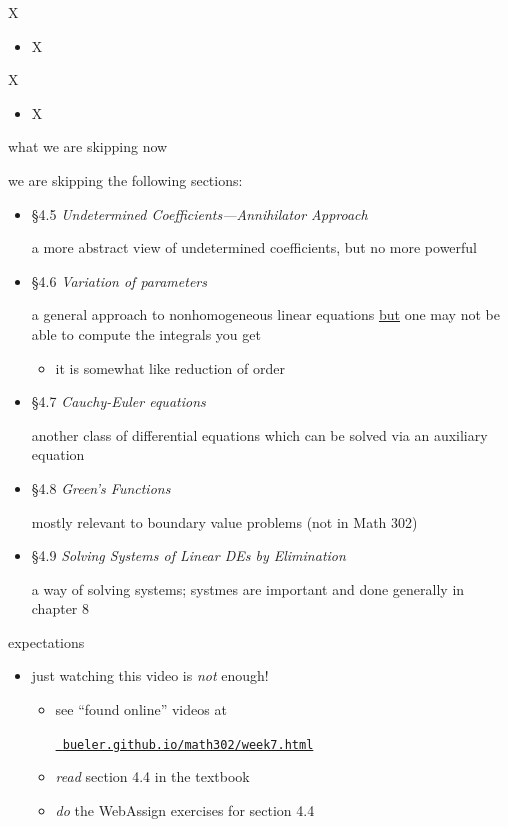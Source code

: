 \documentclass{beamer}
\begin{document}
\begin{frame}{X}

\begin{itemize}
\item X
\end{itemize}
\end{frame}


\begin{frame}{X}

\begin{itemize}
\item X
\end{itemize}
\end{frame}


\begin{frame}{what we are skipping now}

we are \alert{skipping} the following sections:
\begin{itemize}
\item \S 4.5 \emph{Undetermined Coefficients---Annihilator Approach}

a more abstract view of undetermined coefficients, but no more powerful
\item \S 4.6 \emph{Variation of parameters}

a general approach to nonhomogeneous linear equations \underline{but} one may not be able to compute the integrals you get
    \begin{itemize}
    \item it is somewhat like reduction of order
    \end{itemize}
\item \S 4.7 \emph{Cauchy-Euler equations}

another class of differential equations which can be solved via an auxiliary equation
\item \S 4.8 \emph{Green's Functions}

mostly relevant to boundary value problems (not in Math 302)
\item \S 4.9 \emph{Solving Systems of Linear DEs by Elimination}

a way of solving systems; systmes are important and done generally in chapter 8
\end{itemize}
\end{frame}


\begin{frame}{expectations}

\begin{itemize}
\item just watching this video is \emph{not} enough!
     \begin{itemize}
     \item see ``found online'' videos at

     \centerline{\href{https://bueler.github.io/math302/week7.html}{\tt \color{cyan} bueler.github.io/math302/week7.html}}
     \item \emph{read} section 4.4 in the textbook
     \item \emph{do} the WebAssign exercises for section 4.4
     \end{itemize}
\end{itemize}
\end{frame}
\end{document}
